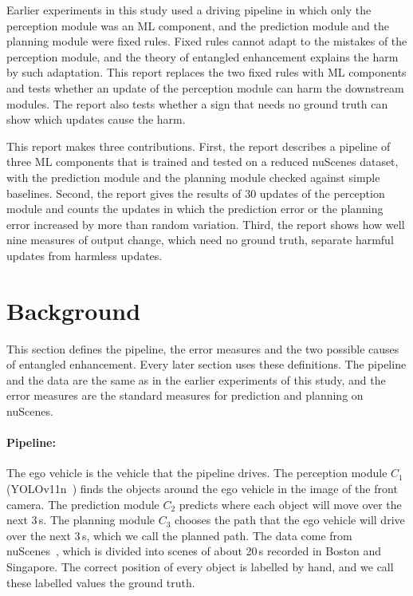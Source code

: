 \documentclass[11pt,a4paper]{article}
\begin{document}
Earlier experiments in this study used a driving pipeline in which only the
perception module was an ML component, and the prediction module and the
planning module were fixed rules. Fixed rules cannot adapt to the mistakes of
the perception module, and the theory of entangled enhancement explains the
harm by such adaptation. This report replaces the two fixed rules with ML
components and tests whether an update of the perception module can harm the
downstream modules. The report also tests whether a sign that needs no ground
truth can show which updates cause the harm.

This report makes three contributions. First, the report describes a pipeline of three
ML components that is trained and tested on a reduced nuScenes dataset, with
the prediction module and the planning module checked against simple
baselines. Second, the report gives the results of 30 updates of the perception module and counts
the updates in which the prediction error or the planning error increased by
more than random variation. Third, the report shows how well nine measures of output
change, which need no ground truth, separate harmful updates from harmless
updates.

\section{Background}
\label{sec:background}

This section defines the pipeline, the error measures and the two possible
causes of entangled enhancement. Every later section uses these definitions.
The pipeline and the data are the same as in the earlier experiments of this
study, and the error measures are the standard measures for prediction and
planning on nuScenes.

\paragraph{Pipeline:} The ego vehicle is the vehicle that the pipeline drives.
The perception module $C_1$ (YOLOv11n~\cite{jocher2024yolo11}) finds the
objects around the ego vehicle in the image of the front camera. The
prediction module $C_2$ predicts where each object will move over the next
3\,s. The planning module $C_3$ chooses the path that the ego vehicle will
drive over the next 3\,s, which we call the planned path. The data come from
nuScenes~\cite{caesar2020nuscenes}, which is divided into scenes of about
20\,s recorded in Boston and Singapore. The correct position of every object is
labelled by hand, and we call these labelled values the ground truth.
\end{document}
